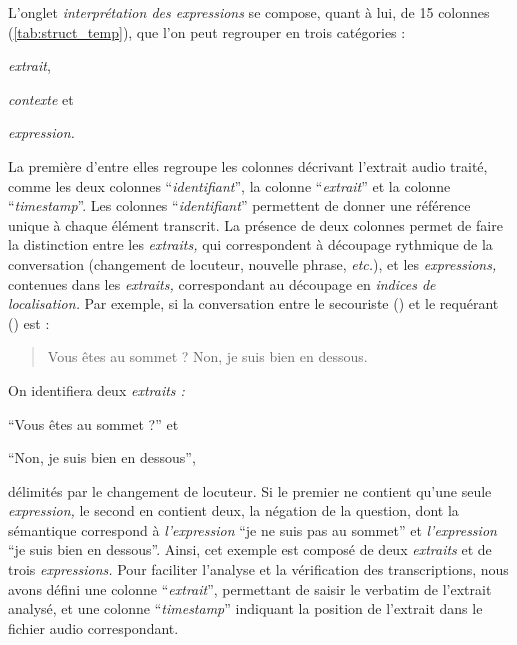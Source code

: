 L'onglet \emph{interprétation
  des expressions} se compose, quant à lui, de 15 colonnes
(\autoref{tab:struct_temp}), que l'on peut regrouper en trois
catégories :
%
\begin{enumerate*}[label=(\alph*)]
\item \emph{extrait},
\item \emph{contexte} et
\item \emph{expression.}
\end{enumerate*}

La première d'entre elles regroupe les colonnes décrivant l'extrait
audio traité, comme les deux colonnes \enquote{\emph{identifiant}}, la
colonne \enquote{\emph{extrait}} et la colonne
\enquote{\emph{timestamp}}. Les colonnes \enquote{\emph{identifiant}}
permettent de donner une référence unique à chaque élément
transcrit. La présence de deux colonnes permet de faire la distinction
entre les \emph{extraits,} qui correspondent à découpage rythmique de
la conversation (changement de locuteur, nouvelle phrase,
\emph{etc.}), et les \emph{expressions,} contenues dans les
\emph{extraits,} correspondant au découpage en \emph{indices de
  localisation.} Par exemple, si la conversation entre le secouriste
() et le requérant () est :
%
\begin{quote}
  \begin{dialogue}
    \Sec Vous êtes au sommet ?
    \Req Non, je suis bien en dessous.
  \end{dialogue}
\end{quote}
%
On identifiera deux \emph{extraits :}
%
\begin{enumerate*}[label=(\alph*)]
\item \enquote{Vous êtes au sommet ?} et
\item \enquote{Non, je suis bien en dessous},
\end{enumerate*}
%
délimités par le changement de locuteur. Si le premier ne contient
qu'une seule \emph{expression,} le second en contient deux, la
négation de la question, dont la sémantique correspond à
\emph{l'expression} \enquote{je ne suis pas au sommet} et
\emph{l'expression} \enquote{je suis bien en dessous}. Ainsi, cet
exemple est composé de deux \emph{extraits} et de trois
\emph{expressions.} Pour faciliter l'analyse et la vérification des
transcriptions, nous avons défini une colonne
\enquote{\emph{extrait}}, permettant de saisir le verbatim de
l'extrait analysé, et une colonne \enquote{\emph{timestamp}} indiquant
la position de l'extrait dans le fichier audio correspondant.

